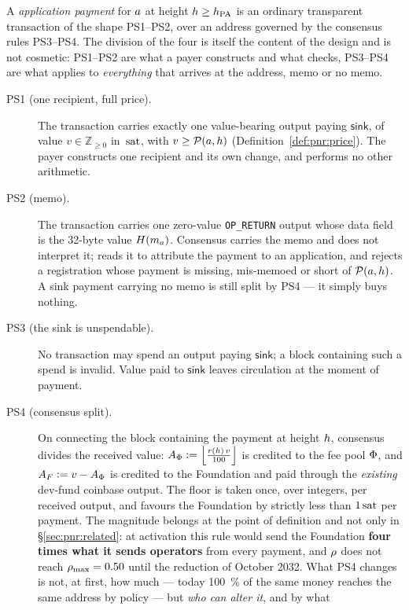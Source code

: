\begin{definition}
A \emph{\PNR application payment} for $a$ at height $h \ge h_{\mathrm{PA}}$ is an ordinary transparent
transaction of the shape PS1--PS2, over an address governed by the consensus rules PS3--PS4. The
division of the four is itself the content of the design and is not cosmetic: PS1--PS2 are what a
payer constructs and what \FluxOS checks, PS3--PS4 are what \fluxd applies to \emph{everything} that
arrives at the address, memo or no memo.
\begin{description}
  \item[PS1 (one recipient, full price).] The transaction carries exactly one value-bearing output
    paying $\mathsf{sink}$, of value $v \in \mathbb{Z}_{\ge 0}$ in $\,\mathrm{sat}$, with
    $v \ge \mathcal{P}(a,h)$ (Definition~\ref{def:pnr:price}). The payer constructs one recipient
    and its own change, and performs no other arithmetic.
  \item[PS2 (memo).] The transaction carries one zero-value \texttt{OP\_RETURN} output whose data
    field is the \num{32}-byte value $H(m_{a})$. Consensus carries the memo and does not interpret
    it; \FluxOS reads it to attribute the payment to an application, and rejects a registration
    whose payment is missing, mis-memoed or short of $\mathcal{P}(a,h)$. A sink payment carrying no
    memo is still split by PS4 --- it simply buys nothing.
  \item[PS3 (the sink is unspendable).] No transaction may spend an output paying $\mathsf{sink}$;
    a block containing such a spend is invalid. Value paid to $\mathsf{sink}$ leaves circulation at
    the moment of payment.
  \item[PS4 (consensus split).] On connecting the block containing the payment at height $h$,
    consensus divides the received value: $A_\Phi \vcentcolon= \left\lfloor \frac{r(h)\,v}{100} \right\rfloor$ is credited to
    the fee pool $\Phi$, and $A_F \vcentcolon= v - A_\Phi$ is credited to the Foundation and paid through
    the \emph{existing} dev-fund coinbase output. The floor is taken once, over integers, per
    received output, and favours the Foundation by strictly less than $1\,\mathrm{sat}$ per payment.
    The magnitude belongs at the point of definition and not only in \S\ref{sec:pnr:related}: at
    activation this rule would send the Foundation \textbf{four times what it sends operators} from
    every payment, and $\rho$ does not reach $\rho_{\max} = 0.50$ until the reduction of
    October 2032. What PS4 changes is not, at first, how much --- today \SI{100}{\percent} of the
    same money reaches the same address by policy --- but \emph{who can alter it}, and by what

\end{description}
\end{definition}
